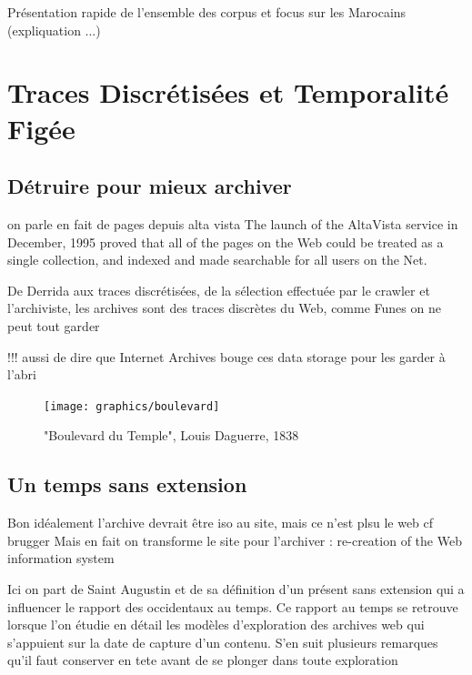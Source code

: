 \documentclass[symmetric,justified,marginals=raggedouter]{tufte-book}
\begin{document}
Présentation rapide de l'ensemble des corpus et focus sur les Marocains (expliquation ...)


\chapter{Traces Discrétisées et Temporalité Figée} 
\label{chap:4}

\section{Détruire pour mieux archiver}
\label{sec:4_derrida}

on parle en fait de pages depuis alta vista The launch of the AltaVista service in December, 1995 proved that all
of the pages on the Web could be treated as a single collection, and
indexed and made searchable for all users on the Net.

De Derrida aux traces discrétisées, de la sélection effectuée par le crawler et l'archiviste, les archives sont des traces discrètes du Web, comme Funes on ne peut tout garder 



!!! aussi de dire que Internet Archives bouge ces data storage pour les garder à l'abri

\begin{figure}
  \centering
  \texttt{[image: graphics/boulevard]}
  \caption{"Boulevard du Temple", Louis Daguerre, 1838}
  \label{fig:boulevard}
\end{figure}


\section{Un temps sans extension}
\label{sec:4_temporalite}

Bon idéalement l'archive devrait être iso au site, mais ce n'est plsu le web cf brugger 
Mais en fait on transforme le site pour l'archiver : re-creation of the Web information system

Ici on part de Saint Augustin et de sa définition d'un présent sans extension qui a influencer le rapport des occidentaux au temps. Ce rapport au temps se retrouve lorsque l'on étudie en détail les modèles d'exploration des archives web qui s'appuient sur la date de capture d'un contenu. S'en suit plusieurs remarques qu'il faut conserver en tete avant de se plonger dans toute exploration
\end{document}
